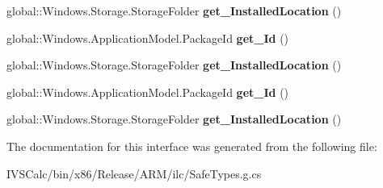 \begin{DoxyCompactItemize}
global\+::\+Windows.\+Storage.\+Storage\+Folder {\bfseries get\+\_\+\+Installed\+Location} ()
\item 
\mbox{\label{interface_windows_1_1_application_model_1_1_i_package_ae11185e898bfdbaf22592088c8aa95d9}} 
global\+::\+Windows.\+Application\+Model.\+Package\+Id {\bfseries get\+\_\+\+Id} ()
\item 
\mbox{\label{interface_windows_1_1_application_model_1_1_i_package_ada43e61f2329b8abc4a43de9f9eb5bd3}} 
global\+::\+Windows.\+Storage.\+Storage\+Folder {\bfseries get\+\_\+\+Installed\+Location} ()
\item 
\mbox{\label{interface_windows_1_1_application_model_1_1_i_package_ae11185e898bfdbaf22592088c8aa95d9}} 
global\+::\+Windows.\+Application\+Model.\+Package\+Id {\bfseries get\+\_\+\+Id} ()
\item 
\mbox{\label{interface_windows_1_1_application_model_1_1_i_package_ada43e61f2329b8abc4a43de9f9eb5bd3}} 
global\+::\+Windows.\+Storage.\+Storage\+Folder {\bfseries get\+\_\+\+Installed\+Location} ()
\end{DoxyCompactItemize}


The documentation for this interface was generated from the following file\+:\begin{DoxyCompactItemize}
\item 
I\+V\+S\+Calc/bin/x86/\+Release/\+A\+R\+M/ilc/Safe\+Types.\+g.\+cs\end{DoxyCompactItemize}
